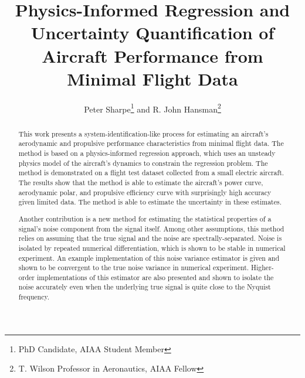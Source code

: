 \documentclass[conf]{new-aiaa}
\title{Physics-Informed Regression and Uncertainty Quantification of Aircraft Performance from Minimal Flight Data}
\author{Peter Sharpe\footnote{PhD Candidate, AIAA Student Member} and R. John Hansman\footnote{T. Wilson Professor in Aeronautics, AIAA Fellow}}
\affil{Massachusetts Institute of Technology, Cambridge, MA}
\begin{document}
    

    \maketitle

    \begin{abstract}

        This work presents a system-identification-like process for estimating an aircraft's aerodynamic and propulsive performance characteristics from minimal flight data. The method is based on a physics-informed regression approach, which uses an unsteady physics model of the aircraft's dynamics to constrain the regression problem. The method is demonstrated on a flight test dataset collected from a small electric aircraft. The results show that the method is able to estimate the aircraft's power curve, aerodynamic polar, and propulsive efficiency curve with surprisingly high accuracy given limited data. The method is able to estimate the uncertainty in these estimates.

        Another contribution is a new method for estimating the statistical properties of a signal's noise component from the signal itself. Among other assumptions, this method relies on assuming that the true signal and the noise are spectrally-separated. Noise is isolated by repeated numerical differentiation, which is shown to be stable in numerical experiment. An example implementation of this noise variance estimator is given and shown to be convergent to the true noise variance in numerical experiment. Higher-order implementations of this estimator are also presented and shown to isolate the noise accurately even when the underlying true signal is quite close to the Nyquist frequency.

    \end{abstract}
\end{document}
